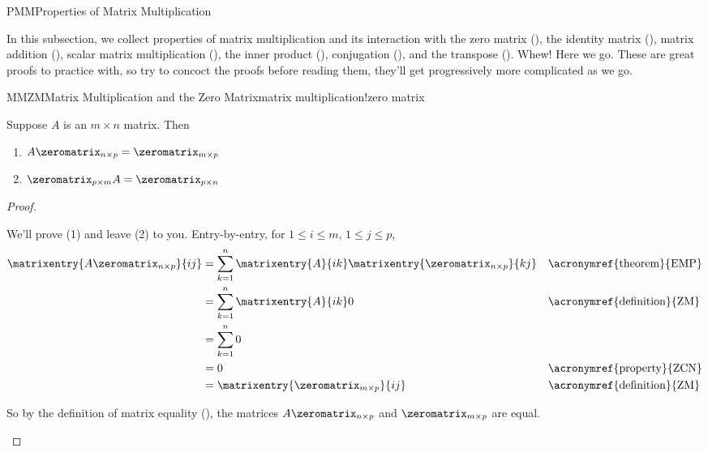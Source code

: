 \begin{subsect}{PMM}{Properties of Matrix Multiplication}
%
\begin{para}In this subsection, we collect properties of matrix multiplication and its interaction with
the zero matrix (),
the identity matrix (),
matrix addition (),
scalar matrix multiplication (),
the inner product (),
conjugation (),
and
the transpose ().
Whew!  Here we go.  These are great proofs to practice with, so try to concoct the proofs before reading them, they'll get progressively more complicated as we go.\end{para}
%
\begin{theorem}{MMZM}{Matrix Multiplication and the Zero Matrix}{matrix multiplication!zero matrix}
\begin{para}Suppose $A$ is an $m\times n$ matrix.  Then
\begin{enumerate}
\item $A\zeromatrix_{n\times p}=\zeromatrix_{m\times p}$
\item $\zeromatrix_{p\times m}A=\zeromatrix_{p\times n}$
\end{enumerate}
\end{para}
\end{theorem}
%
\begin{proof}
\begin{para}We'll prove (1) and leave (2) to you.  Entry-by-entry, for $1\leq i\leq m$, $1\leq j\leq p$,
%
\begin{align*}
\matrixentry{A\zeromatrix_{n\times p}}{ij}
&=\sum_{k=1}^{n}\matrixentry{A}{ik}\matrixentry{\zeromatrix_{n\times p}}{kj}
&&\text{\acronymref{theorem}{EMP}}\\
%
&=\sum_{k=1}^{n}\matrixentry{A}{ik}0
&&\text{\acronymref{definition}{ZM}}\\
%
&=\sum_{k=1}^{n}0\\
%
&=0
&&\text{\acronymref{property}{ZCN}}\\
%
&=\matrixentry{\zeromatrix_{m\times p}}{ij}
&&\text{\acronymref{definition}{ZM}}
\end{align*}
\end{para}
%
\begin{para}So by the definition of matrix equality (), the matrices $A\zeromatrix_{n\times p}$ and $\zeromatrix_{m\times p}$ are equal.\end{para}

\end{proof}
\end{subsect}
